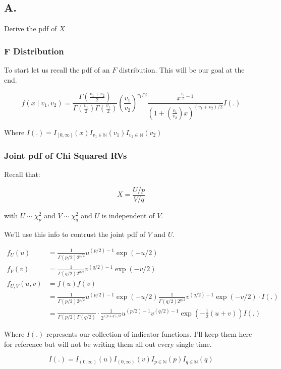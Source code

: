 \subsection*{A.}

Derive the  pdf of $X$

\subsubsection*{F Distribution}

To start let us recall the pdf of an $F$ distribution. This will be our goal at the end.

\[
f(x \mid v_1, v_2) = 
\frac{\Gamma(\frac{v_1 + v_2}{2})}{\Gamma(\frac{v_1}{2})\Gamma(\frac{v_1}{2})}
\left(\frac{v_1}{v_2}\right)^{v_1/2}
\frac{x^{\frac{v_1}{2} - 1}}{\left( 1 + \left( \frac{v_1}{v_2} \right)x \right)^{(v_1 + v_2)/2}}
I(.)
\]

Where $I(.) = I_{[0, \infty]}(x)I_{v_1 \in \mathbb{N}}(v_1)I_{v_2 \in \mathbb{N}}(v_2)$

\subsubsection*{Joint pdf of Chi Squared RVs}

Recall that:

\[X = \frac{U/p}{V/q}\]

with $U\sim \chi^2_p$ and $V \sim \chi^2_q$ and $U$ is independent of $V$.

We'll use this info to contrust the joint pdf of $V$ and $U$.

\begin{align*}
	f_U(u) &= \frac{1}{\Gamma(p/2) 2^{p/2}} u^{(p/2)-1} \exp(-u/2) \\
	f_V(v) &= \frac{1}{\Gamma(q/2) 2^{q/2}} v^{(q/2)-1} \exp(-v/2) \\
	f_{U,V}(u,v) &= f(u) f(v) \\ 
	&= \frac{1}{\Gamma(p/2) 2^{p/2}} u^{(p/2)-1} \exp(-u/2) \frac{1}{\Gamma(q/2) 2^{q/2}} v^{(q/2)-1} \exp(-v/2) \cdot I(.) \\
	&= \frac{}{\Gamma(p/2) \Gamma(q/2)} \cdot \frac{1}{2^{(p+q)/2}} u^{(p/2)-1} v^{(q/2)-1} \exp\left( -\frac{1}{2}(u+v) \right) I(.)
\end{align*}

Where $I(.)$ represents our collection of indicator functions. I'll keep them here for reference but will not be writing them all out every single time.

	\[I(.) = I_{(0,\infty)}(u)I_{(0,\infty)}(v)I_{p \in \mathbb{N}}(p)I_{q \in \mathbb{N}}(q)\]

